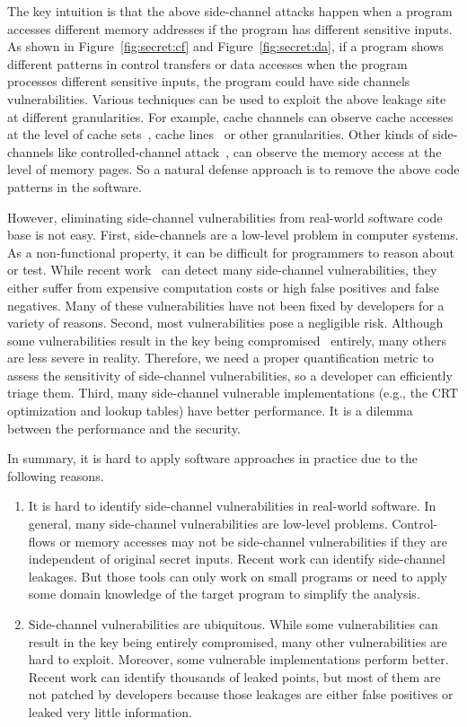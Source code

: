 The key intuition is that the above side-channel attacks happen when a program accesses different memory addresses if the program has different sensitive inputs. As shown in Figure~\ref{fig:secret:cf} and Figure~\ref{fig:secret:da}, if a program shows different patterns in control transfers or data accesses when the program processes different sensitive inputs, the program could have side channels vulnerabilities. Various techniques can be used to exploit the above leakage site at different granularities. For example, cache channels can observe cache accesses at the level of cache sets~\cite{liu2015last}, cache lines~\cite{184415} or other granularities. Other kinds of side-channels like controlled-channel attack~\cite{7163052}, can observe the memory access at the level of memory pages. So a natural defense approach is to remove the above code patterns in the software.


However, eliminating side-channel vulnerabilities from real-world software code base is not easy. First, side-channels are a low-level problem in computer systems. As a non-functional property, it can be difficult for programmers to reason about or test.  While recent work~\cite{203878,217537,Wichelmann:2018:MFF:3274694.3274741,Brotzman19Casym,236338,182946} can detect many side-channel vulnerabilities, they either suffer from expensive computation costs or high false positives and false negatives. Many of these vulnerabilities have not been fixed by developers for a variety of reasons. Second, most vulnerabilities pose a negligible risk. Although some vulnerabilities result in the key being compromised~\cite{184415, aumuller2002fault} entirely, many others are less severe in reality. Therefore, we need a proper quantification metric to assess the sensitivity of side-channel vulnerabilities, so a developer can efficiently triage them.  Third, many side-channel vulnerable implementations (e.g., the CRT optimization and lookup tables) have better performance. It is a dilemma between the performance and the security.


In summary, it is hard to apply software approaches in practice due to the following reasons.

\begin{enumerate}
    \item It is hard to identify side-channel vulnerabilities in real-world software. In general, many side-channel vulnerabilities are low-level problems. Control-flows or memory accesses may not be side-channel vulnerabilities if they are independent of original secret inputs. Recent work can identify side-channel leakages. But those tools can only work on small programs or need to apply some domain knowledge of the target program to simplify the analysis.
    \item Side-channel vulnerabilities are ubiquitous. While some vulnerabilities can result in the key being entirely compromised, many other vulnerabilities are hard to exploit. Moreover, some vulnerable implementations perform better. Recent work can identify thousands of leaked points, but most of them are not patched by developers because those leakages are either false positives or leaked very little information.
\end{enumerate}

